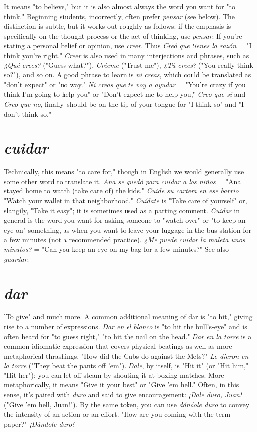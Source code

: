 \documentclass[14pt,a4paper,oneside]{memoir}
\begin{document}
It means "to believe," but it is also almost always the word
you want for "to think." Beginning students, incorrectly, often prefer
\emph{pensar} (see below). The distinction is subtle, but it works out roughly
as follows: if the emphasis is specifically on the thought process or the
act of thinking, use \emph{pensar}. If you're stating a personal belief or opinion, use \emph{creer}. Thus \emph{Creó que tienes la razón} = "I think you're right."
\emph{Creer} is also used in many interjections and phrases, such as \emph{¿Qué
	crees?} ("Guess what?"), \emph{Créeme} ("Trust me"), \emph{¿Tú crees?} ("You really
think so?"), and so on. A good phrase to learn is \emph{ni creas}, which could
be translated as "don't expect" or "no way." \emph{Ni creas que te voy a ayudar} = "You're crazy if you think I'm going to help you" or "Don't expect me to help you," \emph{Creo que sí} and \emph{Creo que no}, finally, should be
on the tip of your tongue for "I think so" and "I don't think so."

\section{\emph{cuidar}}

Technically, this means "to care for," though in English we
would generally use some other word to translate it. \emph{Ana se quedó
	para cuidar a los niños} = "Ana stayed home to watch (take care of)
the kids." \emph{Cuide su cartera en ese barrio} = "Watch your wallet in that
neighborhood." \emph{Cuídate} is "Take care of yourself" or, slangily, "Take it
easy"; it is sometimes used as a parting comment. \emph{Cuidar} in general is
the word you want for asking someone to "watch over" or "to keep an
eye on" something, as when you want to leave your luggage in the bus
station for a few minutes (not a recommended practice). \emph{¿Me puede
	cuidar la maleta unos minutos?} = "Can you keep an eye on my bag
for a few minutes?" See also \emph{guardar}.

\section{\emph{dar}}

'To give" and much more. A common additional meaning of
dar is "to hit," giving rise to a number of expressions. \emph{Dar en el blanco}
is "to hit the bull's-eye" and is often heard for "to guess right," "to hit
the nail on the head." \emph{Dar en la torre} is a common idiomatic expression that covers physical beatings as well as more metaphorical thrashings. "How did the Cubs do against the Mets?" \emph{Le dieron en la torre}
("They beat the pants off 'em"). \emph{Dale}, by itself, is "Hit it" (or "Hit
him," "Hit her"); you can let off steam by shouting it at boxing matches.
More metaphorically, it means "Give it your best" or "Give 'em hell."
Often, in this sense, it's paired with \emph{duro} and said to give encouragement: \emph{¡Dale duro, Juan!} ("Give 'em hell, Juan!"). By the same token,
you can use \emph{dándole duro} to convey the intensity of an action or an
effort. "How are you coming with the term paper?" \emph{¡Dándole duro!}
\end{document}
